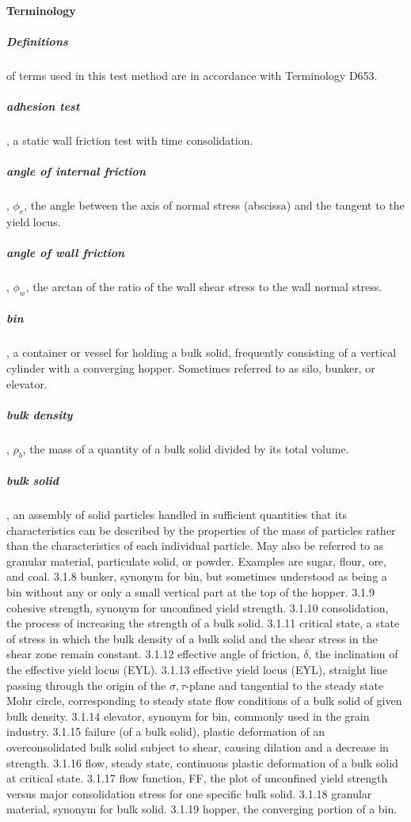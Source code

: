 \paragraph{Terminology}
\subparagraph{Definitions} of terms used in this test method are in accordance with Terminology D653.
\subparagraph{adhesion test}, a static wall friction test with time consolidation.
\subparagraph{angle of internal friction}, $\phi_e$, the angle between the axis of normal stress (abscissa) and the tangent to the yield locus.
\subparagraph{angle of wall friction}, $\phi_w$, the arctan of the ratio of the wall shear stress to the wall normal stress.
\subparagraph{bin}, a container or vessel for holding a bulk solid, frequently consisting of a vertical cylinder with a converging hopper. Sometimes referred to as silo, bunker, or elevator.
\subparagraph{bulk density},  $\rho_b$, the mass of a quantity of a bulk solid divided by its total volume.
\subparagraph{bulk solid}, an assembly of solid particles handled in sufficient quantities that its characteristics can be described by the properties of the mass of particles rather than the characteristics of each individual particle. May also be referred to as granular material, particulate solid, or powder. Examples are sugar, flour, ore, and coal.
3.1.8 bunker, synonym for bin, but sometimes understood as being a bin without any or only a small vertical part at the top of the hopper.
3.1.9 cohesive strength, synonym for unconfined yield strength.
3.1.10 consolidation, the process of increasing the strength of a bulk solid.
3.1.11 critical state, a state of stress in which the bulk density of a bulk solid and the shear stress in the shear zone remain constant.
3.1.12 effective angle of friction, $\delta$, the inclination of the effective yield locus (EYL).
3.1.13 effective yield locus (EYL), straight line passing through the origin of the $\sigma, \tau$-plane and tangential to the steady state Mohr circle, corresponding to steady state flow conditions of a bulk solid of given bulk density.
3.1.14 elevator, synonym for bin, commonly used in the grain industry.
3.1.15 failure (of a bulk solid), plastic deformation of an overconsolidated bulk solid subject to shear, causing dilation and a decrease in strength.
3.1.16 flow, steady state, continuous plastic deformation of a bulk solid at critical state.
3.1.17 flow function, FF, the plot of unconfined yield strength versus major consolidation stress for one specific bulk solid.
3.1.18 granular material, synonym for bulk solid.
3.1.19 hopper, the converging portion of a bin.
